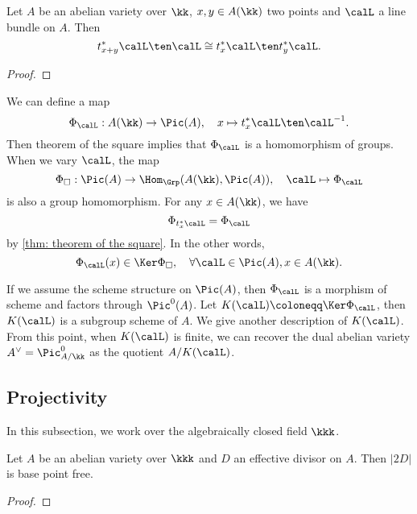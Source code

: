     \begin{theorem}\label{thm: theorem of the square}
        Let \(A\) be an abelian variety over \(\kk\), \(x,y \in A(\kk)\) two points and \(\calL\) a line bundle on \(A\).
        Then 
        \[ t_{x+y}^*\calL \ten \calL \cong t_x^*\calL \ten t_y^*\calL. \]
    \end{theorem}
    \begin{proof}
    \end{proof}

    \begin{remark}\label{rmk: theorem of the square and homomorphism to Picard group}
        We can define a map
        \[ \Phi_\calL: A(\kk) \to \Pic(A), \quad x \mapsto t_x^*\calL \ten \calL^{-1}. \]
        Then theorem of the square implies that \(\Phi_\calL\) is a homomorphism of groups.
        When we vary \(\calL\), the map 
        \[ \Phi_{\square}: \Pic(A) \to \Hom_{\Grp}(A(\kk), \Pic(A)), \quad \calL \mapsto \Phi_\calL \]
        is also a group homomorphism.
        For any \(x \in A(\kk)\), we have
        \[ \Phi_{t_x^*\calL} = \Phi_\calL \]
        by \cref{thm: theorem of the square}.
        In the other words, 
        \[ \Phi_\calL(x) \in \Ker \Phi_{\square}, \quad \forall \calL \in \Pic(A), x \in A(\kk). \]
    \end{remark}

    If we assume the scheme structure on \(\Pic(A)\), then \(\Phi_\calL\) is a morphism of scheme and factors through \(\Pic^0(A)\).
    Let \(K(\calL) \coloneqq \Ker \Phi_\calL\), then \(K(\calL)\) is a subgroup scheme of \(A\).
    We give another description of \(K(\calL)\).
    From this point, when \(K(\calL)\) is finite, we can recover the dual abelian variety \(A^\vee = \Pic^0_{A/\kk}\) as the quotient \(A/K(\calL)\).



\subsection{Projectivity}

    In this subsection, we work over the algebraically closed field \(\kkk\).

    \begin{proposition}\label{prop:2D_is_base_point_free}
        Let \(A\) be an abelian variety over \(\kkk\) and \(D\) an effective divisor on \(A\).
        Then \(|2D|\) is base point free.
    \end{proposition}
    \begin{proof}
    \end{proof}

